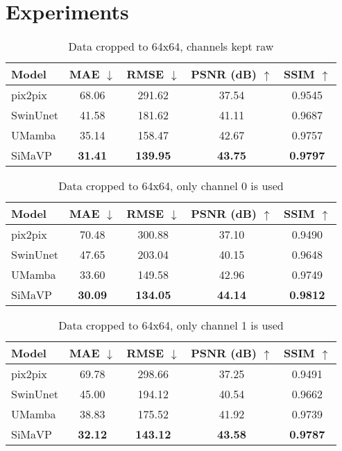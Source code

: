 \chapter{Experiments}

\begin{table}[]
\centering
\caption{Data cropped to 64x64, channels kept raw}
\label{tab:experiment_results}
\begin{tabular}{lcccc}
\hline
\textbf{Model} & \textbf{MAE} $\downarrow$ & \textbf{RMSE} $\downarrow$ & \textbf{PSNR (dB)} $\uparrow$ & \textbf{SSIM} $\uparrow$ \\
\hline
pix2pix  & 68.06 & 291.62 & 37.54 & 0.9545 \\
SwinUnet & 41.58 & 181.62 & 41.11 & 0.9687 \\
UMamba   & 35.14 & 158.47 & 42.67 & 0.9757 \\
SiMaVP   & \textbf{31.41} & \textbf{139.95} & \textbf{43.75} & \textbf{0.9797} \\
\hline
\end{tabular}
\end{table}

\begin{table}[]
    \centering
    \caption{Data cropped to 64x64, only channel 0 is used}
    \label{tab:experiment_results_ch0}
    \begin{tabular}{lcccc}
    \hline
    \textbf{Model} & \textbf{MAE} $\downarrow$ & \textbf{RMSE} $\downarrow$ & \textbf{PSNR (dB)} $\uparrow$ & \textbf{SSIM} $\uparrow$ \\
    \hline
    pix2pix  & 70.48 & 300.88 & 37.10 & 0.9490 \\
    SwinUnet & 47.65 & 203.04 & 40.15 & 0.9648 \\
    UMamba   & 33.60 & 149.58 & 42.96 & 0.9749 \\
    SiMaVP   & \textbf{30.09} & \textbf{134.05} & \textbf{44.14} & \textbf{0.9812} \\
    \hline
    \end{tabular}
\end{table}

\begin{table}[]
    \centering
    \caption{Data cropped to 64x64, only channel 1 is used}
    \label{tab:experiment_results_ch1}
    \begin{tabular}{lcccc}
    \hline
    \textbf{Model} & \textbf{MAE} $\downarrow$ & \textbf{RMSE} $\downarrow$ & \textbf{PSNR (dB)} $\uparrow$ & \textbf{SSIM} $\uparrow$ \\
    \hline
    pix2pix  & 69.78 & 298.66 & 37.25 & 0.9491 \\
    SwinUnet & 45.00 & 194.12 & 40.54 & 0.9662 \\
    UMamba   & 38.83 & 175.52 & 41.92 & 0.9739 \\
    SiMaVP   & \textbf{32.12} & \textbf{143.12} & \textbf{43.58} & \textbf{0.9787} \\
    \hline
    \end{tabular}
\end{table}

